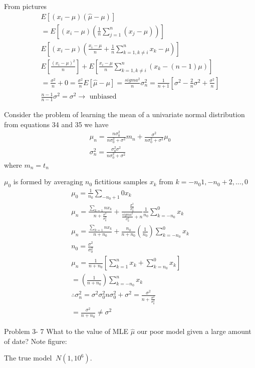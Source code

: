 \documentclass[11pt]{article}
\begin{document}
From pictures 
\begin{eqnarray}
	E [ (x_i - \mu )(\hat{\mu} - \mu )] \\
	= E[ (x_i - \mu) ( \frac{1}{n} \sum _{j=1}^n (x_j - \mu)  )] \\
	E [ (x_i - \mu) ( \frac{x_i - \mu}{n} + \frac{1}{n} \sum _{k=1, k\neq i}^n x_k - \mu  ) ] \\
	E [ \frac{ (x_i - \mu)^2 }{n}  ] + E [ \frac{ x_i - \mu }{n} \sum_{k=1, k\neq i} ^n (x_k - (n-1)\mu )] \\
	= \frac{\sigma^2}{n} + 0 = \frac{\sigma^2}{n}
	E [ \hat{\mu} - \mu ] = \frac{sigma^2}{n}
	\sigma_n ^2 = \frac{1}{n+1} [ \sigma^2 - \frac{2}{n} \sigma^2 + \frac{\sigma^2} {n}  ] \\
	\frac{n-1}{n-1} \sigma^2 = \sigma^2 \to \textrm{ unbiased}
\end{eqnarray}



Consider the problem of learning the mean of a univariate normal distribution from equations 34 and 35 we have
\begin{eqnarray}
	\mu _n = \frac{n \sigma_0 ^2} {n \sigma_0 ^2 + \sigma^2} m_n + \frac{\sigma^2}{n \sigma_0 ^2 + \sigma^2} \mu_0\\
	\sigma_n ^2 = \frac{ \sigma_0 ^2 \sigma^2 }{ n \sigma_0 ^2 + \sigma^2}
\end{eqnarray}
where $m_n = t_n $

$\mu_0$ is formed by averaging $n_0$ fictitious samples $x_k$ from $k= -n_0 1 , -n_0 +2 , ..., 0$
\begin{eqnarray}
\mu _0 = \frac{1}{n_0} \sum _{-n_0 + 1}{0} x_k \\
\mu_n = \frac{ \sum_{k=1}{n} x_k }{ n + \frac{\sigma^2}{\sigma_0 ^2}} + \frac{ \frac{\sigma^2}{\sigma_0^2}}{\frac{sigma^2}{\sigma_0 ^2} +n} \frac{1}{n_0} \sum _{k=-n_0} ^0 x_k \\
\mu _n =\frac { \sum_{k=1}{n} x_k }{n+n_0} + \frac{n_0}{n+n_0} (\frac{1}{n_0})\sum_{k=-n_0} ^0 x_k \\
n_0 = \frac{\sigma^2} {\sigma_0 ^2} \\
\mu _n = \frac{1}{n+ n_0} [ \sum_{k=1}^n x_k + \sum _{k=n_0} ^0 x_k] \\
=  (\frac{1}{n+ n_0}) \sum_{k= -n_0} ^ n x_k \\
\therefore \sigma_n^2 = {\sigma^2 \sigma_0^2}{n \sigma_0 ^2 + \sigma^2} = \frac{\sigma^2} {n + \frac{\sigma^2}{\sigma_0^2}} \\
= \frac{\sigma^2} {n+ n_0} \neq \sigma^2 
\end{eqnarray}

Problem 3- 7 
What to the value of MLE $\hat{\mu}$ our poor model given a large amount of date?  Note figure:

The true model $~N(1, 10^6)$.
\end{document}
